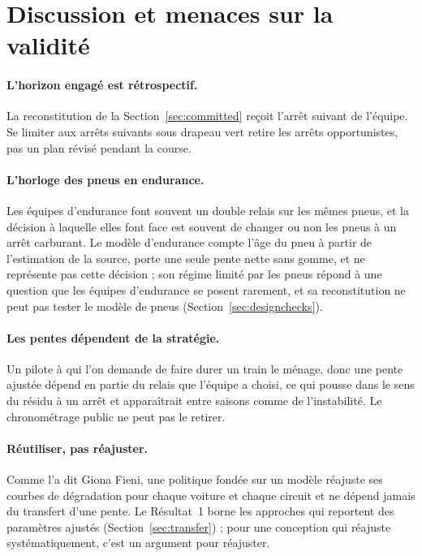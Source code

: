 \documentclass[11pt,a4paper]{article}
\begin{document}
\section{Discussion et menaces sur la validité}
\label{sec:threats}

\paragraph{L'horizon engagé est rétrospectif.} La reconstitution de la
Section~\ref{sec:committed} reçoit l'arrêt suivant de l'équipe. Se limiter aux
arrêts suivants sous drapeau vert retire les arrêts opportunistes, pas un plan
révisé pendant la course.

\paragraph{L'horloge des pneus en endurance.} Les équipes d'endurance font
souvent un double relais sur les mêmes pneus, et la décision à laquelle elles
font face est souvent de changer ou non les pneus à un arrêt carburant. Le
modèle d'endurance compte l'âge du pneu à partir de l'estimation de la source,
porte une seule pente nette sans gomme, et ne représente pas cette décision ;
son régime limité par les pneus répond à une question que les équipes
d'endurance se posent rarement, et sa reconstitution ne peut pas tester le
modèle de pneus (Section~\ref{sec:designchecks}).

\paragraph{Les pentes dépendent de la stratégie.} Un pilote à qui l'on demande de
faire durer un train le ménage, donc une pente ajustée dépend en partie du relais
que l'équipe a choisi, ce qui pousse dans le sens du résidu à un arrêt et
apparaîtrait entre saisons comme de l'instabilité. Le chronométrage public ne
peut pas le retirer.

\paragraph{Réutiliser, pas réajuster.} Comme l'a dit Giona Fieni, une politique
fondée sur un modèle réajuste ses courbes de dégradation pour chaque voiture et
chaque circuit et ne dépend jamais du transfert d'une pente. Le Résultat~1 borne
les approches qui reportent des paramètres ajustés (Section~\ref{sec:transfer}) ;
pour une conception qui réajuste systématiquement, c'est un argument pour
réajuster.
\end{document}
